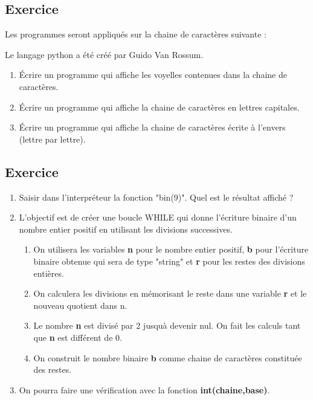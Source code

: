 \documentclass[11pt,a4paper]{article}
\newcounter{numexo}
\begin{document}
\subsection*{\Large Exercice \thenumexo }
Les programmes seront appliqués sur la chaine de caractères suivante :
\begin{center}
Le langage python a été créé par Guido Van Rossum.
\end{center}
\begin{enumerate}
\item Écrire un programme qui affiche les voyelles contenues dans la chaine de caractères.
\item Écrire un programme qui affiche la chaine de caractères en lettres capitales.
\item Écrire un programme qui affiche la chaine de caractères écrite à l'envers (lettre par lettre).
\end{enumerate}

\addtocounter{numexo}{1}
\subsection*{\Large Exercice \thenumexo }
\begin{enumerate}
\item Saisir dans l'interpréteur la fonction "bin(9)". Quel est le résultat affiché ?
\item L'objectif est de créer une boucle WHILE qui donne l'écriture binaire d'un nombre entier positif en utilisant les divisions successives.
\begin{enumerate}
\item On utilisera les variables \textbf{n} pour le nombre entier positif, \textbf{b} pour l'écriture binaire obtenue qui sera de type "string" et \textbf{r} pour les restes des divisions entières.   
\item On calculera les divisions en mémorisant le reste dans une variable \textbf{r} et le nouveau quotient dans n.    
\item Le nombre \textbf{n} est divisé par 2 jusquà devenir nul. On fait les calculs tant que \textbf{n} est différent de 0.    
\item On construit le nombre binaire \textbf{b} comme chaine de caractères constituée des restes.
\end{enumerate}
\item On pourra faire une vérification avec la fonction \textbf{int(chaine,base)}.
\end{enumerate}
\end{document}
